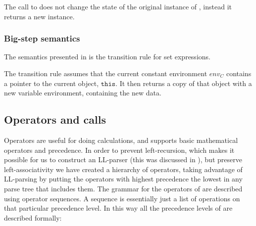 The call to  does not change the state of the original
instance of , instead it returns a new instance.

\subsubsection{Big-step semantics}

The semantics presented in  is the transition rule for
set expressions.



The transition rule assumes that the current constant environment $env_C$
contains a pointer to the current object, $\texttt{this}$. It then returns a
copy of that object with a new variable environment, containing the new data.

\subsection{Operators and calls}
\label{sec:operatorsandcalls}

Operators are useful for doing calculations, and \productname{} supports
basic mathematical operators and precedence. In order to prevent
left-recursion, which makes it possible for us to construct an LL-parser
(this was discussed in ), but
preserve left-associativity we have created a hierarchy of operators,
taking advantage of LL-parsing by putting the operators with highest
precedence the lowest in any parse tree that includes them. The grammar
for the operators of \productname{} are described using operator
sequences. A sequence is essentially just a list of operations on that
particular precedence level. In this way all the precedence levels of
\productname{} are described formally:

\begin{ebnf}
\end{ebnf}


